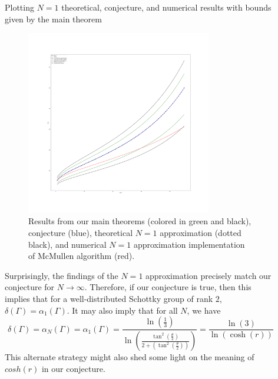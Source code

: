 \documentclass[final]{beamer}
\newlength{\sepwid}
\newlength{\onecolwid}
\begin{document}
\begin{frame}[t]
\begin{columns}[t]
\begin{column}{\onecolwid}
\end{column}







\begin{column}{\sepwid}\end{column}%


\begin{column}{\onecolwid}



\begin{block}{Plotting $N=1$ theoretical, conjecture, and numerical results with bounds given by the main theorem}
\begin{figure}[H]
\centering
\includegraphics[width=0.8\textwidth]{Results from our main theorem, conjecture, and implementation of McMullen algorithm.png}
\caption{Results from our main theorems (colored in green and black), conjecture (blue), theoretical $N=1$ approximation (dotted black), and numerical $N=1$ approximation implementation of McMullen algorithm (red).}
\end{figure}
\end{block}



\begin{scriptsize}
Surprisingly, the findings of the $N=1$ approximation precisely match our conjecture for $N\to \infty$. Therefore, if our conjecture is true, then this implies that for a well-distributed Schottky group of rank $2$, $\delta(\Gamma)=\alpha_1(\Gamma)$. It may also imply that for all $N$, we have $$\delta(\Gamma)=\alpha_N(\Gamma)=\alpha_1(\Gamma)=\frac{\ln\left(\frac{1}{3}\right)}{\ln\left(\frac{\tan^2\left(\frac{\theta}{2}\right)}{2+\left(\tan^2\left(\frac{\theta}{2}\right)\right)} \right)}=\frac{\ln\left(3\right)}{\ln\left(\cosh\left(r\right)\right)}$$
 This alternate strategy might also shed some light on the meaning of $cosh(r)$ in our conjecture.


\end{scriptsize}
\end{column}
\end{columns}
\end{frame}
\end{document}
